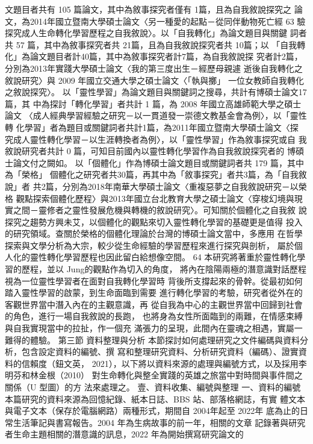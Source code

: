 文題目者共有 105 篇論文，其中為敘事探究者僅有 1篇，且為自我敘說探究之
論文，為2014年國立暨南大學碩士論文〈另一種愛的起點－從同伴動物死亡經
63 
驗探究成人生命轉化學習歷程之自我敘說〉。以「自我轉化」為論文題目與關鍵
詞者共 57 篇，其中為敘事探究者共 21篇，且為自我敘說探究者共 10篇；以
「自我轉化」為論文題目者計40篇，其中為敘事探究者計7篇，為自我敘說探
究者計2篇，分別為2013年實踐大學碩士論文〈我的第三度出生－經歷母親遽
逝後自我轉化之敘說研究〉與 2009 年國立交通大學之碩士論文〈「執與擲」
一位女教師自我轉化之敘說探究〉。 
以「靈性學習」為論文題目與關鍵詞之搜尋，共計有博碩士論文17篇，其
中為探討「轉化學習」者共計 1 篇，為 2008 年國立高雄師範大學之碩士論文
〈成人經典學習經驗之研究－以一貫道發一崇德文教基金會為例〉，以「靈性轉
化學習」者為題目或關鍵詞者共計1篇，為2011年國立暨南大學碩士論文〈探
究成人靈性轉化學習－以生涯轉換者為例〉，以「靈性學習」作為敘事探究或自
我敘說研究者共計 0 篇，可知目前國內以靈性轉化學習作為自我敘說探究者的
博碩士論文付之闕如。 
以「個體化」作為博碩士論文題目或關鍵詞者共 179 篇，其中為「榮格」
個體化之研究者共30篇，再其中為「敘事探究」者共3篇，為「自我敘說」者
共2篇，分別為2018年南華大學碩士論文〈重複惡夢之自我敘說研究－以榮格
觀點探索個體化歷程〉與2013年國立台北教育大學之碩士論文〈穿梭幻境與現
實之間－靈修者之靈性發展危機與轉機的敘說研究〉。可知關於個體化之自我敘
說探究之趨勢方興未艾，以個體化的觀點來切入靈性轉化學習的基礎更是值得
投入的研究領域。查關於榮格的個體化理論於台灣的博碩士論文當中，多應用
在哲學探索與文學分析為大宗，較少從生命經驗的學習歷程來進行探究與剖析，
屬於個人化的靈性轉化學習歷程也因此留白給想像空間。 
64 
本研究將著重於靈性轉化學習的歷程，並以 Jung的觀點作為切入的角度，
將內在陰陽兩極的潛意識對話歷程視為一位靈性學習者在面對自我轉化學習時
背後所支撐起來的骨幹。從最初如何踏入靈性學習的啟蒙，到生命面臨到需要
進行轉化學習的考驗，研究者從外在的客觀世界當中潛入內在的主觀意識，再
從自我為中心的主觀世界當中回歸到社會的角色，進行一場自我敘說的長跑，
也將身為女性所面臨到的兩難，在情感束縛與自我實現當中的拉扯，作一個充
滿張力的呈現，此間內在靈魂之相遇，實屬一難得的體驗。 
第三節 資料整理與分析 
本節探討如何處理研究之文件編碼與資料分析，包含設定資料的編號、撰
寫和整理研究資料、分析研究資料（編碼）、證實資料的信賴度（鈕文英，
2021），以下將以資料來源的處理與編號方式，以及採用李明芬和林金根（2010）
對生命轉化與整全實踐的英雄之旅當中對時間與事件間之關係（U 型圖）的方
法來處理之。 
壹、資料收集、編號與整理 
一、資料的編號 
本篇研究的資料來源為回憶紀錄、紙本日誌、BBS 站、部落格網誌，有實
體文本與電子文本（保存於電腦網路）兩種形式，期間自 2004年起至 2022年
底為止的日常生活筆記與書寫報告。2004 年為生病故事的前一年，相關的文章
記錄著與研究者生命主題相關的潛意識的訊息，2022 年為開始撰寫研究論文的

